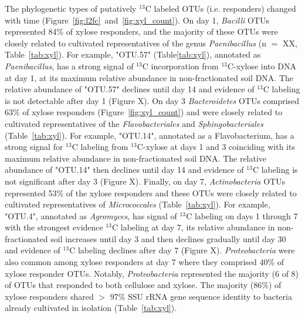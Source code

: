 The phylogenetic types of putatively $^{13}$C labeled OTUs (i.e. responders)
changed with time (Figure~\ref{fig:l2fc}~and~\ref{fig:xyl_count}). On day 1,
\textit{Bacilli} OTUs represented 84\% of xylose responders, and the majority
of these OTUs were closely related to cultivated representatives of the genus
\textit{Paenibacillus} (n $=$ XX, Table~\ref{tab:xyl}). For example, "OTU.57"
(Table\ref{tab:xyl}), annotated as \textit{Paenibacillus}, has a strong signal
of $^{13}$C incorporation from $^{13}$C-xylose into DNA at day 1, at its
maximum relative abundance in non-fractionated soil DNA. The relative abundance
of "OTU.57" declines until day 14 and evidence of $^{13}$C labeling is not
detectable after day 1 (Figure X). On day 3 \textit{Bacteroidetes} OTUs
comprised 63\% of xylose responders (Figure~\ref{fig:xyl_count}) and were
closely related to cultivated representatives of the \textit{Flavobacteriales}
and \textit{Sphingobacteriales} (Table~\ref{tab:xyl}). For example, "OTU.14",
annotated as a Flavobacterium, has a strong signal for $^{13}$C labeling from
$^{13}$C-xylose at days 1 and 3 coinciding with its maximum relative abundance
in non-fractionated soil DNA. The relative abundance of "OTU.14" then declines
until day 14 and evidence of $^{13}$C  labeling is not significant after day
3 (Figure X). Finally, on day 7, \textit{Actinobacteria} OTUs represented 53\%
of the xylose responders and these OTUs were closely related to cultivated
representatives of \textit{Micrococcales} (Table~\ref{tab:xyl}). For example,
"OTU.4", annotated as \textit{Agromyces}, has signal of $^{13}$C labeling on
days 1 through 7 with the strongest evidence $^{13}$C labeling at day 7, its
relative abundance in non-fractionated soil increases until day
3 and then declines gradually until day 30 and evidence of $^{13}$C labeling
  declines after day 7 (Figure X). \textit{Proteobacteria} were also common
  among xylose responders at day 7 where they comprised 40\% of xylose
  responder OTUs. Notably, \textit{Proteobacteria} represented the majority (6
  of
8) of OTUs that responded to both cellulose and xylose. The
majority (86\%) of xylose responders shared $>$ 97\% SSU rRNA gene
sequence identity to bacteria already cultivated in isolation
(Table~\ref{tab:xyl}). 


